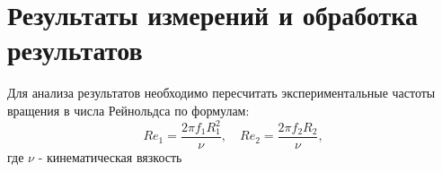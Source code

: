 \documentclass[a4paper,12pt]{article}
\begin{document}

\newpage
\section{Результаты измерений и обработка результатов}
Для анализа результатов необходимо пересчитать экспериментальные частоты вращения в числа Рейнольдса по формулам:
\[
Re_1 = \frac{2\pi f_1 R_1^2}{\nu}, \quad Re_2 = \frac{2\pi f_2 R_2}{\nu},
\]
где $\nu$ - кинематическая вязкость


\end{document}
